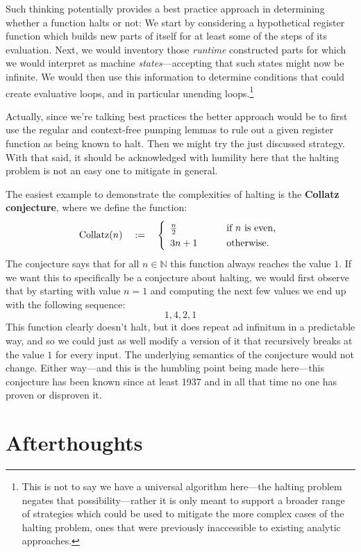 \documentclass[twoside]{article}
\newcommand{\qdefeq}{\ensuremath{\quad :=\quad}}
\newcommand{\strong}[1]{{\bfseries #1}}
\begin{document}
Such thinking potentially provides a best practice approach in determining whether a function halts or not: We start by
considering a hypothetical register function which builds new parts of itself for at least some of the steps of its
evaluation. Next, we would inventory those \emph{runtime} constructed parts for which we would interpret as machine
\emph{states}---accepting that such states might now be infinite. We would then use this information to determine
conditions that could create evaluative loops, and in particular unending loops.\footnote{This is not to say we have
a universal algorithm here---the halting problem negates that possibility---rather it is only meant to support a broader
range of strategies which could be used to mitigate the more complex cases of the halting problem, ones that were
previously inaccessible to existing analytic approaches.}

Actually, since we're talking best practices the better approach would be to first use the regular and context-free
pumping lemmas to rule out a given register function as being known to halt. Then we might try the just discussed
strategy. With that said, it should be acknowledged with humility here that the halting problem is not
an easy one to mitigate in general.

The easiest example to demonstrate the complexities of halting
is the \strong{Collatz conjecture}, where we define the function:
$$ \def\arraystretch{1.3}
\mbox{Collatz}(n) \qdefeq \left\{\begin{array}{ll}
\frac{n}{2}	& \qquad \mbox{if } n \mbox{ is even,}				\\
3n+1		& \qquad \mbox{otherwise.}
\end{array}\right. $$
The conjecture says that for all $ n\in\mathbb{N} $ this function always reaches the value $ 1 $. If we want this
to specifically be a conjecture about halting, we would first observe that by starting with value $ n = 1 $ and computing
the next few values we end up with the following sequence:
$$ 1, 4, 2, 1 $$
This function clearly doesn't halt, but it does repeat ad infinitum in a predictable way, and so we could just as
well modify a version of it that recursively breaks at the value $ 1 $ for every input. The underlying semantics
of the conjecture would not change. Either way---and this is the humbling point being made here---this conjecture
has been known since at least 1937 and in all that time no one has proven or disproven it.

\section*{Afterthoughts}
\end{document}
